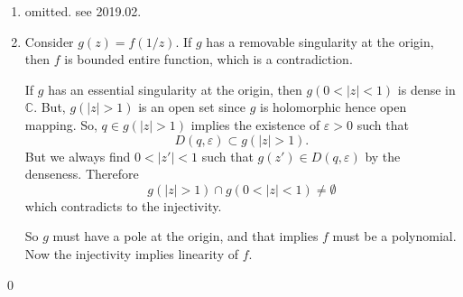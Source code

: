 \begin{problem} \hfill
	\begin{enumerate}[label = (\alph*)]
		\item omitted. see 2019.02.\\

		\item Consider $g(z) = f(1/z)$.
			If $g$ has a removable singularity at the origin, then $f$ is bounded entire function, which is a contradiction.

			If $g$ has an essential singularity at the origin, then $g(0 < |z| < 1)$ is dense in $\mathbb{C}$.
			But, $g(|z| > 1)$ is an open set since $g$ is holomorphic hence open mapping.
			So, $q \in g(|z| > 1)$ implies the existence of $\varepsilon>0$ such that
			\[
				D(q, \varepsilon) \subset g\left( |z| >1 \right).
			\]
			But we always find $0 < |z'| < 1$ such that $g(z') \in D(q, \varepsilon)$ by the denseness.
			Therefore
			\[
				g\left( |z| > 1 \right) \cap g\left( 0< |z| < 1 \right) \ne \emptyset
			\]
			which contradicts to the injectivity.

			So $g$ must have a pole at the origin, and that implies $f$ must be a polynomial.
			Now the injectivity implies linearity of $f$.
	\end{enumerate}

	\qed
\end{problem}

